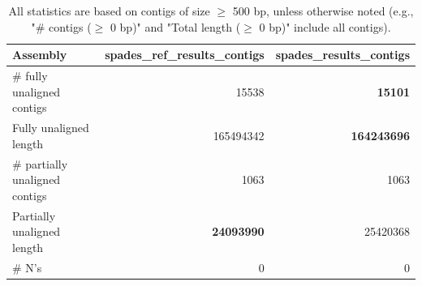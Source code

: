 \documentclass[12pt,a4paper]{article}
\begin{document}
\begin{table}[ht]
\begin{center}
\caption{All statistics are based on contigs of size $\geq$ 500 bp, unless otherwise noted (e.g., "\# contigs ($\geq$ 0 bp)" and "Total length ($\geq$ 0 bp)" include all contigs).}
\begin{tabular}{|l*{2}{|r}|}
\hline
Assembly & spades\_ref\_results\_contigs & spades\_results\_contigs \\ \hline
\# fully unaligned contigs & 15538 & {\bf 15101} \\ \hline
Fully unaligned length & 165494342 & {\bf 164243696} \\ \hline
\# partially unaligned contigs & 1063 & 1063 \\ \hline
Partially unaligned length & {\bf 24093990} & 25420368 \\ \hline
\# N's & 0 & 0 \\ \hline
\end{tabular}
\end{center}
\end{table}
\end{document}
